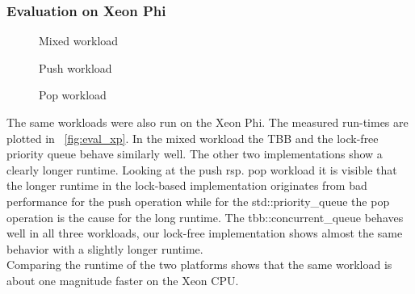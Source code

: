 \subsubsection{Evaluation on Xeon Phi}
\begin{figure*}[t]
	\centering
	\begin{subfigure}[b]{0.3\textwidth}
		\centering
		
		\caption{Mixed workload}
		\label{fig:xp_mixed}
	\end{subfigure}
	\hfill
	\begin{subfigure}[b]{0.3\textwidth}
		\centering
		
		\caption{Push workload}
		\label{fig:xp_push}
	\end{subfigure}
	\hfill
	\begin{subfigure}[b]{0.3\textwidth}
		\centering
		
		\caption{Pop workload}
		\label{fig:xp_pop}
	\end{subfigure}
	\caption{Runtime for different workloads executed on a Xeon Phi while varying the number of threads}
	\label{fig:eval_xp}
\end{figure*}
The same workloads were also run on the Xeon Phi. The measured run-times are plotted in \figurename~\ref{fig:eval_xp}. In the mixed workload the TBB and the lock-free priority queue behave similarly well. The other two implementations show a clearly longer runtime. Looking at the push rsp. pop workload it is visible that the longer runtime in the lock-based implementation originates from bad performance for the push operation while for the std::priority\_queue the pop operation is the cause for the long runtime. The tbb::concurrent\_queue behaves well in all three workloads, our lock-free implementation shows almost the same behavior with a slightly longer runtime.\\

Comparing the runtime of the two platforms shows that the same workload is about one magnitude faster on the Xeon CPU.


